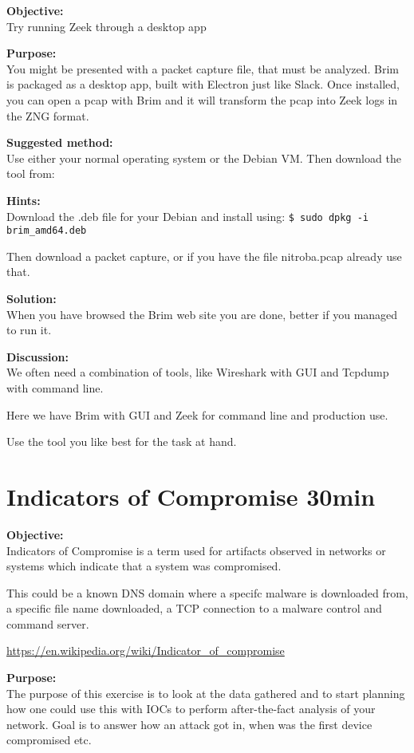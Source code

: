 \documentclass[a4paper,11pt,notitlepage]{report}
\begin{document}

{\bf Objective:}\\
Try running Zeek through a desktop app

{\bf Purpose:}\\
You might be presented with a packet capture file, that must be analyzed. Brim is packaged as a desktop app, built with Electron just like Slack. Once installed, you can open a pcap with Brim and it will transform the pcap into Zeek logs in the ZNG format.

{\bf Suggested method:}\\
Use either your normal operating system or the Debian VM. Then download the tool from:

{\bf Hints:}\\
Download the .deb file for your Debian and install using:
\verb+$ sudo dpkg -i brim_amd64.deb+

Then download a packet capture, or if you have the file nitroba.pcap already use that.

{\bf Solution:}\\
When you have browsed the Brim web site you are done, better if you managed to run it.

{\bf Discussion:}\\
We often need a combination of tools, like Wireshark with GUI and Tcpdump with command line.

Here we have Brim with GUI and Zeek for command line and production use.

Use the tool you like best for the task at hand.



\chapter{Indicators of Compromise 30min}
\label{ex:zeekioc}


{\bf Objective:} \\
Indicators of Compromise is a term used for artifacts observed in networks or systems which indicate that a system was compromised.

This could be a known DNS domain where a specifc malware is downloaded from, a specific file name downloaded, a TCP connection to a malware control and command server.

\url{https://en.wikipedia.org/wiki/Indicator_of_compromise}

{\bf Purpose:}\\
The purpose of this exercise is to look at the data gathered and to start planning how one could use this with IOCs to perform after-the-fact analysis of your network. Goal is to answer how an attack got in, when was the first device compromised etc.
\end{document}

